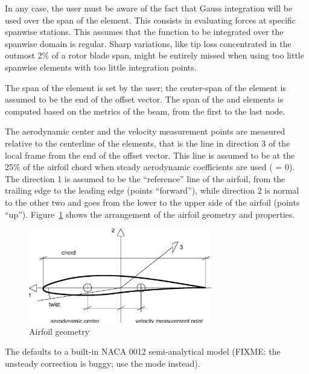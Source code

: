 In any case, the user must be aware of the fact that Gauss integration
will be used over the span of the element.
This consists in evaluating forces at specific spanwise stations.
This assumes that the function to be integrated over the spanwise domain
is regular.
Sharp variations, like tip loss concentrated in the outmost 2\%
of a rotor blade span, might be entirely missed when using too little
spanwise elements with too little integration points.

The span of the  element is set by the user;
the center-span of the element is assumed to be the end of the offset vector.
The span of the  and  elements
is computed based on the metrics of the beam, from the first to the last node.

The aerodynamic center and the velocity measurement points are measured
relative to the centerline of the elements, that is the line in direction 3
of the local frame from the end of the offset vector.
This line is assumed to be at the 25\% of the airfoil chord when steady
aerodynamic coefficients are used ( = 0).
The direction 1 is assumed to be the ``reference'' line of the airfoil, 
from the trailing edge to the leading edge (points ``forward''),
while direction 2 is normal to the other two and goes from the lower 
to the upper side of the airfoil (points ``up''). 
Figure~\ref{fig:AIRFOIL} shows the arrangement of the airfoil geometry 
and properties.

\begin{figure}[h]
  \centering
    \includegraphics[width=80mm]{airfoil.eps}
  \caption{Airfoil geometry}\label{fig:AIRFOIL}
\end{figure}

The  defaults to a built-in NACA 0012 semi-analytical
model (FIXME: the unsteady correction is buggy; use the  
mode instead).

